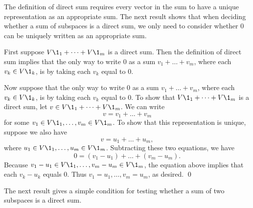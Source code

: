 
The definition of direct sum requires every vector in the sum to have a unique representation as an appropriate sum. The next
result shows that when deciding whether a sum of subspaces is a direct sum, we only need to consider whether $0$ can be uniquely written as an appropriate sum.


\proof
First suppose $V\1_1 + \dots + V\1_m$ is a direct sum.  Then the definition of direct sum implies that the only way to write $0$ as a sum
$v_1 + \dots + v_m$, where each $v_k \in V\1_k$, is by taking each $v_k$ equal to $0$.

Now suppose that the only way to write $0$ as a sum $v_1 + \dots + v_m$, where each
$v_k \in V\1_k$, is by taking each $v_k$ equal to $0$.  To show that $V\1_1 + \dots + V\1_m$ is a direct sum, let $v \in V\1_1 + \dots + V\1_m$.  We can write
\[
v = v_1 + \dots + v_m
\]
for some $v_1 \in V\1_1, \dots, v_m \in V\1_m$.  To show
that this representation is unique, suppose we also have
\[
v = u_1 + \dots + u_m,
\]
where $u_1 \in V\1_1, \dots, u_m \in V\1_m$.  Subtracting
these two equations, we have
\[
0 = (v_1 - u_1) + \dots + (v_m - u_m).
\]
Because $v_1 - u_1 \in V\1_1, \dots, v_m - u_m \in V\1_m$, the equation above implies that each $v_k - u_k$ equals $0$.  Thus $v_1 = u_1, \dots, v_m = u_m$, as desired.
\qed


The next result gives a simple condition for testing whether a sum of two subspaces is a direct sum.

\vspace{7bp}


